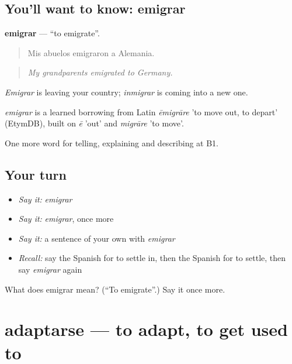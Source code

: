 \subsection*{You'll want to know: emigrar}
\textbf{emigrar} — \textquotedblleft{}to emigrate\textquotedblright{}.

\begin{quote}
Mis abuelos emigraron a Alemania.
\end{quote}

\begin{quote}
\emph{My grandparents emigrated to Germany.}
\end{quote}

\emph{Emigrar} is leaving your country; \emph{inmigrar} is coming into a new one.

\begin{cousinweb}
\emph{emigrar} is a learned borrowing from Latin \emph{ēmigrāre} 'to move out, to depart' (EtymDB), built on \emph{ē} 'out' and \emph{migrāre} 'to move'.
\end{cousinweb}

\begin{grammarlens}[title={What you've built}]
One more word for telling, explaining and describing at B1.
\end{grammarlens}

\subsection*{Your turn}
\begin{itemize}
\raggedright
  \item \emph{Say it:} \emph{emigrar}
  \item \emph{Say it:} \emph{emigrar}, once more
  \item \emph{Say it:} a sentence of your own with \emph{emigrar}
  \item \emph{Recall:} say the Spanish for to settle in, then the Spanish for to settle, then say \emph{emigrar} again
\end{itemize}

\begin{tcolorbox}[breakable,colback=teal!4,colframe=teal!35!black,title={Before you move on}]
What does emigrar mean? (\textquotedblleft{}To emigrate\textquotedblright{}.) Say it once more.
\end{tcolorbox}
\section[adaptarse]{adaptarse — to adapt, to get used to}

